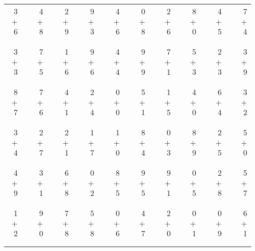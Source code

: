 \documentclass[12pt, letterpaper]{article}
\begin{document}
\begin{tabular}{rrrrrrrrrrrrrrrrrrr}
3 & & 4 & & 2 & & 9 & & 4 & & 0 & & 2 & & 8 & & 4 & & 7\\
$+$ 6 & & $+$ 8 & & $+$ 9 & & $+$ 3 & & $+$ 6 & & $+$ 8 & & $+$ 6 & & $+$ 0 & & $+$ 5 & & $+$ 4\\
\cline{1-1} \cline{3-3} \cline{5-5} \cline{7-7} \cline{9-9} \cline{11-11} \cline{13-13} \cline{15-15} \cline{17-17} \cline{19-19} \\ \\
3 & & 7 & & 1 & & 9 & & 4 & & 9 & & 7 & & 5 & & 2 & & 3\\
$+$ 3 & & $+$ 5 & & $+$ 6 & & $+$ 6 & & $+$ 4 & & $+$ 9 & & $+$ 1 & & $+$ 3 & & $+$ 3 & & $+$ 9\\
\cline{1-1} \cline{3-3} \cline{5-5} \cline{7-7} \cline{9-9} \cline{11-11} \cline{13-13} \cline{15-15} \cline{17-17} \cline{19-19} \\ \\
8 & & 7 & & 4 & & 2 & & 0 & & 5 & & 1 & & 4 & & 6 & & 3\\
$+$ 7 & & $+$ 6 & & $+$ 1 & & $+$ 4 & & $+$ 0 & & $+$ 1 & & $+$ 5 & & $+$ 0 & & $+$ 4 & & $+$ 2\\
\cline{1-1} \cline{3-3} \cline{5-5} \cline{7-7} \cline{9-9} \cline{11-11} \cline{13-13} \cline{15-15} \cline{17-17} \cline{19-19} \\ \\
3 & & 2 & & 2 & & 1 & & 1 & & 8 & & 0 & & 8 & & 2 & & 5\\
$+$ 4 & & $+$ 7 & & $+$ 1 & & $+$ 7 & & $+$ 0 & & $+$ 4 & & $+$ 3 & & $+$ 9 & & $+$ 5 & & $+$ 0\\
\cline{1-1} \cline{3-3} \cline{5-5} \cline{7-7} \cline{9-9} \cline{11-11} \cline{13-13} \cline{15-15} \cline{17-17} \cline{19-19} \\ \\
4 & & 3 & & 6 & & 0 & & 8 & & 9 & & 9 & & 0 & & 2 & & 5\\
$+$ 9 & & $+$ 1 & & $+$ 8 & & $+$ 2 & & $+$ 5 & & $+$ 5 & & $+$ 1 & & $+$ 5 & & $+$ 8 & & $+$ 7\\
\cline{1-1} \cline{3-3} \cline{5-5} \cline{7-7} \cline{9-9} \cline{11-11} \cline{13-13} \cline{15-15} \cline{17-17} \cline{19-19} \\ \\
1 & & 9 & & 7 & & 5 & & 0 & & 4 & & 2 & & 0 & & 0 & & 6\\
$+$ 2 & & $+$ 0 & & $+$ 8 & & $+$ 8 & & $+$ 6 & & $+$ 7 & & $+$ 0 & & $+$ 1 & & $+$ 9 & & $+$ 1\\
\cline{1-1} \cline{3-3} \cline{5-5} \cline{7-7} \cline{9-9} \cline{11-11} \cline{13-13} \cline{15-15} \cline{17-17} \cline{19-19} \\ \\

\end{tabular}
\end{document}
